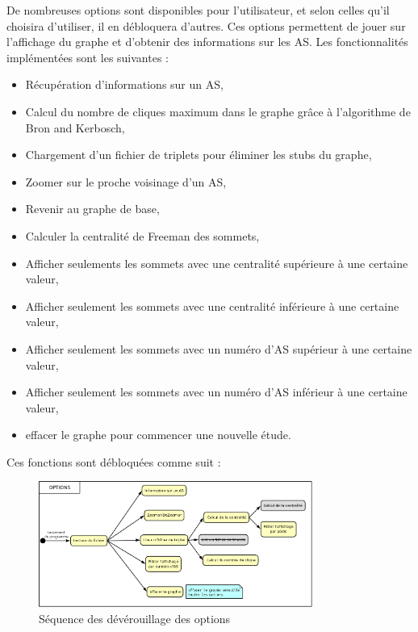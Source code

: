 \par
De nombreuses options sont disponibles pour l'utilisateur, et selon celles qu'il choisira d'utiliser, il en d\'ebloquera d'autres. Ces options permettent de jouer sur l'affichage du graphe et d'obtenir des informations sur les AS. Les fonctionnalit\'es impl\'ement\'ees sont les suivantes :
\begin{itemize}
 \item R\'ecup\'eration d'informations sur un AS,
 \item Calcul du nombre de cliques maximum dans le graphe gr\^ace \`a l'algorithme de Bron and Kerbosch,
 \item Chargement d'un fichier de triplets pour \'eliminer les stubs du graphe,
 \item Zoomer sur le proche voisinage d'un AS,
 \item Revenir au graphe de base,
 \item Calculer la centralit\'e de Freeman des sommets,
 \item Afficher seulements les sommets avec une centralit\'e sup\'erieure \`a une certaine valeur,
 \item Afficher seulement les sommets avec une centralit\'e inf\'erieure \`a une certaine valeur,
 \item Afficher seulement les sommets avec un num\'ero d'AS sup\'erieur \`a une certaine valeur,
 \item Afficher seulement les sommets avec un num\'ero d'AS inf\'erieur \`a une certaine valeur,
 \item effacer le graphe pour commencer une nouvelle \'etude.
\end{itemize}

Ces fonctions sont d\'ebloqu\'ees comme suit :

\begin{figure}[H]
\centering
 \includegraphics[width=0.8\textwidth]{./schema/seqMenu.png}
  \caption{\label{seq_option}S\'equence des d\'ev\'erouillage des options}
\end{figure}


